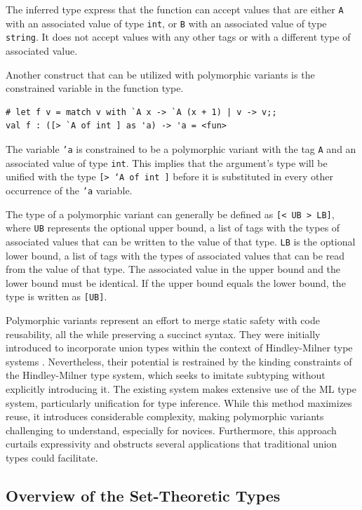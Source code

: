 \documentclass[a4paper,11pt,oneside]{article}
\theoremstyle{definition}
\begin{document}
The inferred type express that the function can accept values that are either \texttt{A} with an associated value of type \texttt{int}, or \texttt{B} with an associated value of type \texttt{string}. It does not accept values with any other tags or with a different type of associated value.

Another construct that can be utilized with polymorphic variants is the constrained variable in the function type.

{\ttfamily\begin{verbatim}
# let f v = match v with `A x -> `A (x + 1) | v -> v;;
val f : ([> `A of int ] as 'a) -> 'a = <fun>
\end{verbatim}}

The variable \texttt{'a} is constrained to be a polymorphic variant with the tag \texttt{A} and an associated value of type \texttt{int}. This implies that the argument's type will be unified with the type \texttt{[> `A of int ]} before it is substituted in every other occurrence of the \texttt{'a} variable.

The type of a polymorphic variant can generally be defined as \texttt{[< UB > LB]}, where \texttt{UB} represents the optional upper bound, a list of tags with the types of associated values that can be written to the value of that type. \texttt{LB} is the optional lower bound, a list of tags with the types of associated values that can be read from the value of that type. The associated value in the upper bound and the lower bound must be identical. If the upper bound equals the lower bound, the type is written as \texttt{[UB]}.

Polymorphic variants represent an effort to merge static safety with code reusability, all the while preserving a succinct syntax. They were initially introduced to incorporate union types within the context of Hindley-Milner type systems \cite{Garrigue_1998}. Nevertheless, their potential is restrained by the kinding constraints of the Hindley-Milner type system, which seeks to imitate subtyping without explicitly introducing it. The existing system makes extensive use of the ML type system, particularly unification for type inference. While this method maximizes reuse, it introduces considerable complexity, making polymorphic variants challenging to understand, especially for novices. Furthermore, this approach curtails expressivity and obstructs several applications that traditional union types could facilitate.

\subsection{Overview of the Set-Theoretic Types}
\end{document}
